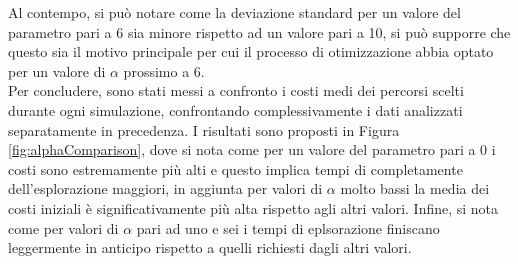 Al contempo, si può notare come la deviazione standard per un valore del parametro pari a 6 sia minore rispetto ad un valore pari a 10, si può supporre che questo sia il motivo principale per cui il processo di otimizzazione abbia optato per un valore di $\alpha$ prossimo a 6.\\
Per concludere, sono stati messi a confronto i costi medi dei percorsi scelti durante ogni simulazione, confrontando complessivamente i dati analizzati separatamente in precedenza.
I risultati sono proposti in Figura \ref{fig:alphaComparison}, dove si nota come per un valore del parametro pari a 0 i costi sono estremamente più alti e questo implica tempi di completamente dell'esplorazione maggiori, in aggiunta per valori di $\alpha$ molto bassi la media dei costi iniziali è significativamente più alta rispetto agli altri valori.
Infine, si nota come per valori di $\alpha$ pari ad uno e sei i tempi di eplsorazione finiscano leggermente in anticipo rispetto a quelli richiesti dagli altri valori.


